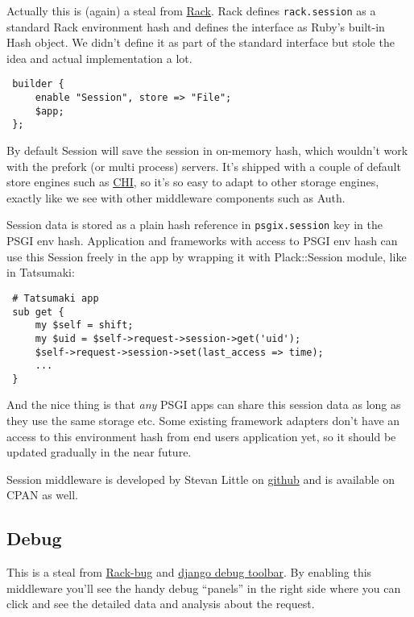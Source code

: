 Actually this is (again) a steal from
\href{http://rack.rubyforge.org/}{Rack}. Rack defines
\lstinline!rack.session! as a standard Rack environment hash and defines
the interface as Ruby's built-in Hash object. We didn't define it as
part of the standard interface but stole the idea and actual
implementation a lot.

\begin{lstlisting}
 builder {
     enable "Session", store => "File";
     $app;
 };
\end{lstlisting}

By default Session will save the session in on-memory hash, which
wouldn't work with the prefork (or multi process) servers. It's shipped
with a couple of default store engines such as
\href{http://search.cpan.org/perldoc?CHI}{CHI}, so it's so easy to adapt
to other storage engines, exactly like we see with other middleware
components such as Auth.

Session data is stored as a plain hash reference in
\lstinline!psgix.session! key in the PSGI env hash. Application and
frameworks with access to PSGI env hash can use this Session freely in
the app by wrapping it with Plack::Session module, like in Tatsumaki:

\begin{lstlisting}
 # Tatsumaki app
 sub get {
     my $self = shift;
     my $uid = $self->request->session->get('uid');
     $self->request->session->set(last_access => time);
     ...
 }
\end{lstlisting}

And the nice thing is that \emph{any} PSGI apps can share this session
data as long as they use the same storage etc. Some existing framework
adapters don't have an access to this environment hash from end users
application yet, so it should be updated gradually in the near future.

Session middleware is developed by Stevan Little on
\href{http://github.com/stevan/plack-middleware-session}{github} and is
available on CPAN as well.

\subsection{Debug}\label{debug}

This is a steal from \href{http://github.com/brynary/rack-bug}{Rack-bug}
and \href{http://github.com/robhudson/django-debug-toolbar}{django debug
toolbar}. By enabling this middleware you'll see the handy debug
``panels'' in the right side where you can click and see the detailed
data and analysis about the request.

